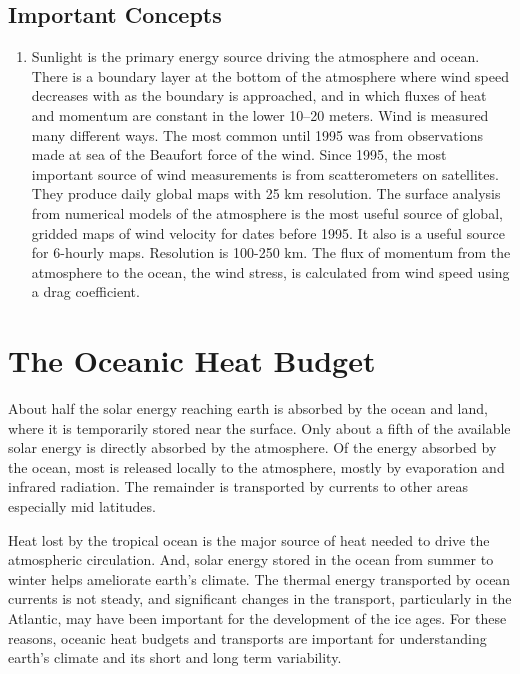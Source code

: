 \section{Important Concepts}

\begin{enumerate}
\item
Sunlight is the primary energy source driving the atmosphere and
ocean.
\vitem
There is a boundary layer at the bottom of the atmosphere where wind
speed decreases with as the boundary is approached, and in which
fluxes of heat and momentum are constant in the lower 10--20 meters.
\vitem
Wind is measured many different ways. The most common until 1995 was
from observations made at sea of the Beaufort
force of the wind.
\vitem
Since 1995, the most important source of wind measurements is from
scatterometers
on satellites. They produce daily global maps with 25 km resolution.
\vitem
The surface analysis from numerical models of the
atmosphere is the most
useful source of global, gridded maps of wind velocity for dates
before 1995. It also is a useful source for 6-hourly maps. Resolution
is 100-250 km.
\vitem
The flux of momentum from the atmosphere to the ocean, the wind
stress, is calculated from wind speed using a drag
coefficient.
\end{enumerate}


\chapter{The Oceanic Heat Budget}
About half the solar energy reaching earth is absorbed by the ocean
and land, where it is temporarily stored near the surface. Only about
a fifth of the available solar energy is directly absorbed by the
atmosphere. Of the energy absorbed by the ocean, most is released
locally to the atmosphere, mostly by evaporation and infrared
radiation. The remainder is transported by
currents to other areas especially mid latitudes.

Heat lost by the tropical ocean is the major source of heat needed to
drive the atmospheric circulation.  And, solar energy stored in the
ocean from summer to winter helps ameliorate earth's climate. The
thermal energy transported by ocean currents is not steady, and
significant changes in the transport, particularly in the Atlantic,
may have been important for the development of the ice ages. For these
reasons, oceanic heat budgets and transports are important for
understanding earth's climate and its short and long term variability.

